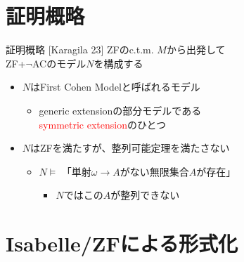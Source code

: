 \documentclass[17pt]{beamer}
\begin{document}
\section{証明概略}
\begin{frame}{証明概略 {\small [Karagila 23]}}
    \vspace{-4pt}
    ZFのc.t.m. $M$から出発して\\
    ZF+$\neg$ACのモデル$N$を構成する
    \vspace{-6pt}
    {\small 
    \begin{itemize}[itemsep=10pt]
        \item $N$はFirst Cohen Modelと呼ばれるモデル
        \begin{itemize}
            \item generic extensionの部分モデルである\\
            \textcolor{red}{symmetric extension}のひとつ
        \end{itemize}              
        \item $N$はZFを満たすが、整列可能定理を満たさない
        \vspace{3pt}
        \begin{itemize}
            \item $N \vDash $ 「単射$\omega \rightarrow A$がない無限集合$A$が存在」
            \begin{itemize}
                \item $N$ではこの$A$が整列できない
            \end{itemize}
        \end{itemize}
    \end{itemize}}
\end{frame}

\section {Isabelle/ZFによる形式化}
\end{document}
